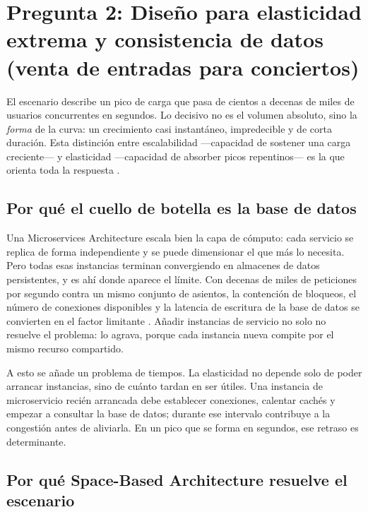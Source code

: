 \section[Pregunta 2: Elasticidad extrema]{Pregunta 2: Diseño para elasticidad extrema y consistencia de datos\\(venta de entradas para conciertos)}


El escenario describe un pico de carga que pasa de cientos a decenas de miles de usuarios concurrentes en segundos. Lo decisivo no es el volumen absoluto, sino la \emph{forma} de la curva: un crecimiento casi instantáneo, impredecible y de corta duración. Esta distinción entre escalabilidad ---capacidad de sostener una carga creciente--- y elasticidad ---capacidad de absorber picos repentinos--- es la que orienta toda la respuesta \parencite{richardsford2020}.

\subsection{Por qué el cuello de botella es la base de datos}

Una Microservices Architecture escala bien la capa de cómputo: cada servicio se replica de forma independiente y se puede dimensionar el que más lo necesita. Pero todas esas instancias terminan convergiendo en almacenes de datos persistentes, y es ahí donde aparece el límite. Con decenas de miles de peticiones por segundo contra un mismo conjunto de asientos, la contención de bloqueos, el número de conexiones disponibles y la latencia de escritura de la base de datos se convierten en el factor limitante \parencite{richardsford2020}. Añadir instancias de servicio no solo no resuelve el problema: lo agrava, porque cada instancia nueva compite por el mismo recurso compartido.

A esto se añade un problema de tiempos. La elasticidad no depende solo de poder arrancar instancias, sino de cuánto tardan en ser útiles. Una instancia de microservicio recién arrancada debe establecer conexiones, calentar cachés y empezar a consultar la base de datos; durante ese intervalo contribuye a la congestión antes de aliviarla. En un pico que se forma en segundos, ese retraso es determinante.

\subsection{Por qué Space-Based Architecture resuelve el escenario}

